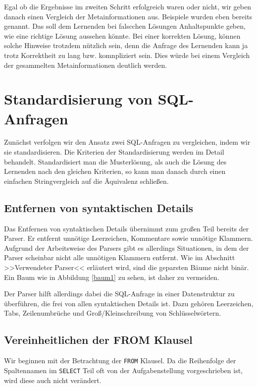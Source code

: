 Egal ob die Ergebnisse im zweiten Schritt erfolgreich waren oder nicht, wir geben danach einen Vergleich der Metainformationen aus. Beispiele wurden eben bereits genannt. Das soll dem Lernenden bei falscchen Lösungen Anhaltspunkte geben, wie eine richtige Lösung aussehen könnte. Bei einer korrekten Lösung, können solche Hinweise trotzdem nützlich sein, denn die Anfrage des Lernenden kann ja trotz Korrektheit zu lang bzw. komnpliziert sein. Dies würde bei einem Vergleich der gesammelten Metainformationen deutlich werden.

\section{Standardisierung von SQL-Anfragen}

Zunächst verfolgen wir den Ansatz zwei SQL-Anfragen zu vergleichen, indem wir sie standardisieren. Die Kriterien der Standardisierung werden im Detail behandelt. Standardisiert man die Musterlösung, als auch die Lösung des Lernenden nach den gleichen Kriterien, so kann man danach durch einen einfachen Stringvergleich auf die Äquivalenz schließen. 

\subsection{Entfernen von syntaktischen Details}

Das Entfernen von syntaktischen Details übernimmt zum großen Teil bereits der Parser. Er entfernt unnötige Leerzeichen, Kommentare sowie unnötige Klammern. Aufgrund der Arbeitsweise des Parsers gibt es allerdings Situationen, in dem der Parser scheinbar nicht alle unnötigen Klammern entfernt. Wie im Abschnitt >>Verwendeter Parser<< erläutert wird, sind die geparsten Bäume nicht binär. Ein Baum wie in Abbildung \ref{baum1} zu sehen, ist daher zu vermeiden. 

Der Parser hilft allerdings dabei die SQL-Anfrage in einer Datenstruktur zu überführen, die frei von allen syntaktischen Details ist. Dazu gehören Leerzeichen, Tabs, Zeilenumbrüche und Groß/Kleinschreibung von Schlüsselwörtern.

\subsection{Vereinheitlichen der FROM Klausel}

Wir beginnen mit der Betrachtung der \verb|FROM| Klausel. Da die Reihenfolge der Spaltennamen im \verb|SELECT| Teil oft von der Aufgabenstellung vorgeschrieben ist, wird diese auch nicht verändert.

